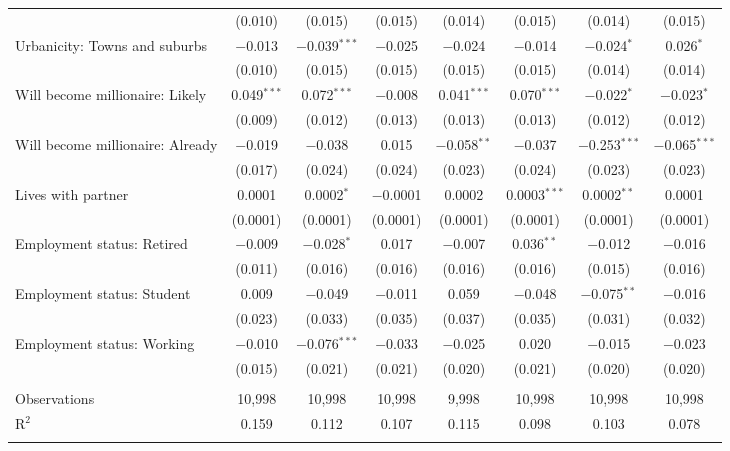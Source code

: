 \begin{tabular}{@{\extracolsep{5pt}}lccccccc}
  & (0.010) & (0.015) & (0.015) & (0.014) & (0.015) & (0.014) & (0.015) \\ 
  Urbanicity: Towns and suburbs & $-$0.013 & $-$0.039$^{***}$ & $-$0.025 & $-$0.024 & $-$0.014 & $-$0.024$^{*}$ & 0.026$^{*}$ \\ 
  & (0.010) & (0.015) & (0.015) & (0.015) & (0.015) & (0.014) & (0.014) \\ 
  Will become millionaire: Likely & 0.049$^{***}$ & 0.072$^{***}$ & $-$0.008 & 0.041$^{***}$ & 0.070$^{***}$ & $-$0.022$^{*}$ & $-$0.023$^{*}$ \\ 
  & (0.009) & (0.012) & (0.013) & (0.013) & (0.013) & (0.012) & (0.012) \\ 
  Will become millionaire: Already & $-$0.019 & $-$0.038 & 0.015 & $-$0.058$^{**}$ & $-$0.037 & $-$0.253$^{***}$ & $-$0.065$^{***}$ \\ 
  & (0.017) & (0.024) & (0.024) & (0.023) & (0.024) & (0.023) & (0.023) \\ 
  Lives with partner & 0.0001 & 0.0002$^{*}$ & $-$0.0001 & 0.0002 & 0.0003$^{***}$ & 0.0002$^{**}$ & 0.0001 \\ 
  & (0.0001) & (0.0001) & (0.0001) & (0.0001) & (0.0001) & (0.0001) & (0.0001) \\ 
  Employment status: Retired & $-$0.009 & $-$0.028$^{*}$ & 0.017 & $-$0.007 & 0.036$^{**}$ & $-$0.012 & $-$0.016 \\ 
  & (0.011) & (0.016) & (0.016) & (0.016) & (0.016) & (0.015) & (0.016) \\ 
  Employment status: Student & 0.009 & $-$0.049 & $-$0.011 & 0.059 & $-$0.048 & $-$0.075$^{**}$ & $-$0.016 \\ 
  & (0.023) & (0.033) & (0.035) & (0.037) & (0.035) & (0.031) & (0.032) \\ 
  Employment status: Working & $-$0.010 & $-$0.076$^{***}$ & $-$0.033 & $-$0.025 & 0.020 & $-$0.015 & $-$0.023 \\ 
  & (0.015) & (0.021) & (0.021) & (0.020) & (0.021) & (0.020) & (0.020) \\ 
 \hline \\[-1.8ex] 

Observations & 10,998 & 10,998 & 10,998 & 9,998 & 10,998 & 10,998 & 10,998 \\ 
R$^{2}$ & 0.159 & 0.112 & 0.107 & 0.115 & 0.098 & 0.103 & 0.078 \\ 
\hline 
\hline \\[-1.8ex] 
\end{tabular} 